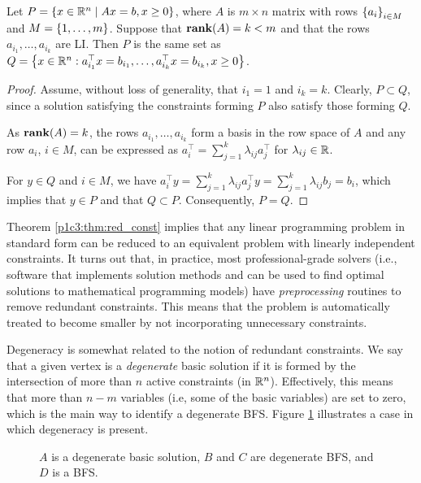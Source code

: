 \begin{theorem}\label{p1c3:thm:red_const}
	Let $P = \left\{ x \in \mathbb{R}^n \mid Ax = b, x \geq 0 \right \}$, where $A$ is $m \times n$ matrix with rows $\left\{ a_i \right \}_{i \in M}$ and $M = \left\{ 1,\dots,m \right \}$. Suppose that $\mathop{\bf rank}(A) = k < m$ and that the rows $a_{i_1}, \dots, a_{i_k}$ are LI. Then $P$ is the same set as $Q = \left\{  x \in \mathbb{R}^n : a^\top_{i_1}x = b_{i_1}, \dots, a^\top_{i_k}x = b_{i_k}, x \geq 0 \right \}$.
\end{theorem}

\begin{proof}
	Assume, without loss of generality, that $i_1 = 1$ and $i_k = k$. Clearly, $P \subset Q$, since a solution satisfying the constraints forming $P$ also satisfy those forming $Q$.
	
	As $\mathop{\bf rank}(A) = k$, the rows $a_{i_1}, \dots, a_{i_k}$ form a basis in the row space of $A$ and any row $a_i$, $i \in M$, can be expressed as $a^\top_i = \sum_{j=1}^k \lambda_{ij}a_j^\top$ for $\lambda_{ij} \in \mathbb{R}$.
	
	For $y \in Q$ and $i \in M$, we have $a_i^\top y = \sum_{j=1}^k \lambda_{ij}a_j^\top y = \sum_{j=1}^k \lambda_{ij}b_{j} = b_i$, which implies that $y \in P$ and that $Q \subset P$. Consequently, $P = Q$. \qedhere			
\end{proof}

Theorem \ref{p1c3:thm:red_const} implies that any linear programming problem in standard form can be reduced to an equivalent problem with linearly independent constraints. It turns out that, in practice, most professional-grade solvers (i.e., software that implements solution methods and can be used to find optimal solutions to mathematical programming models) have \emph{preprocessing} routines to remove redundant constraints. This means that the problem is automatically treated to become smaller by not incorporating unnecessary constraints. 

Degeneracy is somewhat related to the notion of redundant constraints. We say that a given vertex is a \emph{degenerate} basic solution if it is formed by the intersection of more than $n$ active constraints (in $\mathbb{R}^n$). Effectively, this means that more than $n-m$ variables (i.e, some of the basic variables) are set to zero, which is the main way to identify a degenerate BFS. Figure \ref{p1c3:fig:figure1} illustrates a case in which degeneracy is present.

\begin{figure}[h]
	\caption{$A$ is a degenerate basic solution, $B$ and $C$ are degenerate BFS, and $D$ is a BFS.} \label{p1c3:fig:figure1}
\end{figure} 

